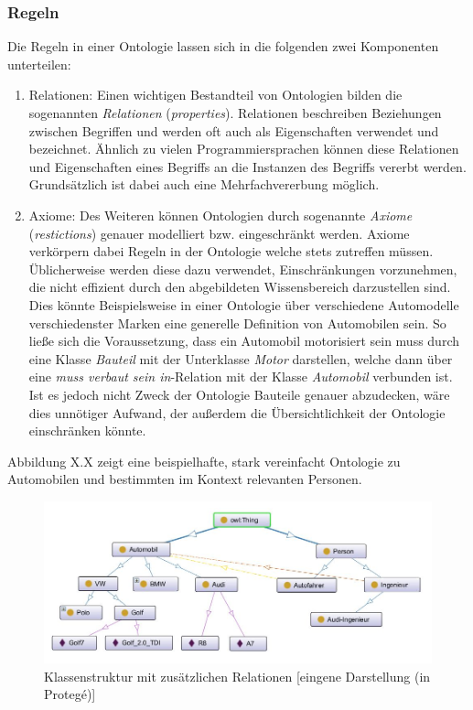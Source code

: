 \documentclass[12pt]{report}
\begin{document}
\subsubsection{Regeln}
Die Regeln in einer Ontologie lassen sich in die folgenden zwei Komponenten unterteilen:
\begin{enumerate}
\item Relationen: Einen wichtigen Bestandteil von Ontologien bilden die sogenannten \textit{Relationen} (\textit{properties}).
Relationen beschreiben Beziehungen zwischen Begriffen und werden oft auch als Eigenschaften verwendet und bezeichnet. Ähnlich zu vielen Programmiersprachen können diese Relationen und Eigenschaften eines Begriffs an die Instanzen des Begriffs vererbt werden. Grundsätzlich ist dabei auch eine Mehrfachvererbung möglich. 

\item Axiome: Des Weiteren können Ontologien durch sogenannte \textit{Axiome} (\textit{restictions})  genauer modelliert bzw. eingeschränkt werden. Axiome verkörpern dabei Regeln in der Ontologie welche stets zutreffen müssen. Üblicherweise werden diese dazu verwendet, Einschränkungen vorzunehmen, die nicht effizient durch den abgebildeten Wissensbereich darzustellen sind. Dies könnte Beispielsweise in einer Ontologie über verschiedene Automodelle verschiedenster Marken eine generelle Definition von Automobilen sein. 
So ließe sich die Voraussetzung, dass ein Automobil motorisiert sein muss durch eine Klasse \textit{Bauteil} mit der Unterklasse \textit{Motor} darstellen, welche dann über eine \textit{muss verbaut sein in}-Relation mit der Klasse \textit{Automobil} verbunden ist. Ist es jedoch nicht Zweck der Ontologie Bauteile genauer abzudecken, wäre dies unnötiger Aufwand, der außerdem die Übersichtlichkeit der Ontologie einschränken könnte.
\end{enumerate}

Abbildung X.X zeigt eine beispielhafte, stark vereinfacht Ontologie zu Automobilen und bestimmten im Kontext relevanten Personen. 

\begin{figure}[H]
\begin{center}
\includegraphics[scale=0.8]{Bilder/ontologyRelations.jpg}
\caption{Klassenstruktur mit zusätzlichen Relationen [eingene Darstellung (in Protegé)]}
\end{center}
\end{figure}
\end{document}
